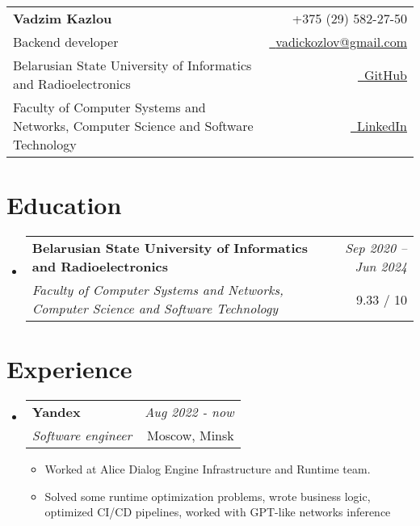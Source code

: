 \documentclass[a4paper,11pt]{article}
\makeatletter
\newcommand{\resumeSubheading}[4]{
\vspace{0.5mm}\item
    \begin{tabular*}{0.98\textwidth}[t]{l@{\extracolsep{\fill}}r}
        \textbf{#1} & \textit{\footnotesize{#4}} \\
        \textit{\footnotesize{#3}} &  \footnotesize{#2}\\
    \end{tabular*}
    \vspace{-2.4mm}
}
\newcommand{\resumeSubHeadingListStart}{\begin{itemize}[leftmargin=*,labelsep=0mm]}
\newcommand{\resumeItemListStart}{\begin{justify}\begin{itemize}[leftmargin=3ex, rightmargin=2ex, noitemsep,labelsep=1.2mm,itemsep=0mm]\small}
\newcommand{\resumeSubHeadingListEnd}{\end{itemize}\vspace{2mm}}
\newcommand{\resumeItemListEnd}{\end{itemize}\end{justify}\vspace{-2mm}}
\newcommand{\name}{Vadzim Kazlou} %
\newcommand{\course}{Backend developer} %
\newcommand{\phone}{+375 (29) 582-27-50} %
\newcommand{\emaila}{vadickozlov@gmail.com} %
\makeatother
\begin{document}
\selectfont


\parbox{\dimexpr\linewidth\relax}{
\begin{tabularx}{\linewidth}{L r} \\
  \textbf{\Large \name} & {\raisebox{0.0\height}{\footnotesize \faPhone}\ \phone}\\
  \course &  \href{mailto:\emaila}{\raisebox{0.0\height}{\footnotesize \faEnvelope}\ {\emaila}}\\
  {Belarusian State University of Informatics and Radioelectronics} &  \href{https://github.com/six-nine}{\raisebox{0.0\height}{\footnotesize \faGithub}\ {GitHub}} \\
  {Faculty of Computer Systems and Networks, Computer Science and Software Technology} & \href{https://www.linkedin.com/in/vadim-kozlov-675732212/}{\raisebox{0.0\height}{\footnotesize \faLinkedin}\ {LinkedIn}}
\end{tabularx}
}





\section{\textbf{Education}}
  \resumeSubHeadingListStart
    \resumeSubheading
      {Belarusian State University of Informatics and Radioelectronics}{9.33 / 10}
      {Faculty of Computer Systems and Networks, Computer Science and Software Technology}{Sep 2020 -- Jun 2024}
  \resumeSubHeadingListEnd
\vspace{-5.5mm}
%



\section{\textbf{Experience}}
  \resumeSubHeadingListStart
    \resumeSubheading
      {Yandex}{Moscow, Minsk}
      {Software engineer}{Aug 2022 - now}
      \vspace{-2.0mm}
      \resumeItemListStart
    \item {Worked at Alice Dialog Engine Infrastructure and Runtime team.}
    \item {Solved some runtime optimization problems, wrote business logic, optimized CI/CD pipelines, worked with GPT-like networks inference}
    \resumeItemListEnd
  \resumeSubHeadingListEnd
\vspace{-8.5mm}
\end{document}
